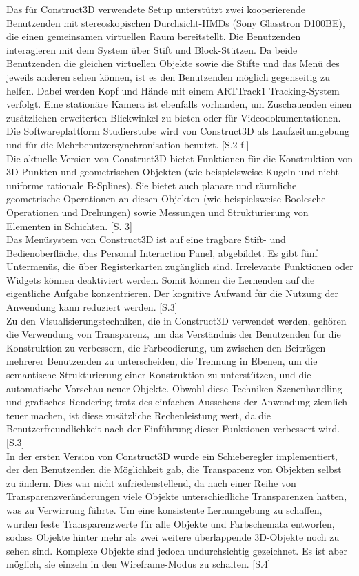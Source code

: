 \documentclass[deutsch]{llncs}
\begin{document}
Das für Construct3D verwendete Setup unterstützt zwei kooperierende Benutzenden mit stereoskopischen Durchsicht-HMDs (Sony Glasstron D100BE), die einen gemeinsamen virtuellen Raum bereitstellt. Die Benutzenden interagieren mit dem System über Stift und Block-Stützen. Da beide Benutzenden die gleichen virtuellen Objekte sowie die Stifte und das Menü des jeweils anderen sehen können, ist es den Benutzenden möglich gegenseitig zu helfen. Dabei werden Kopf und Hände mit einem ARTTrack1 Tracking-System verfolgt. Eine stationäre Kamera ist ebenfalls vorhanden, um Zuschauenden einen zusätzlichen erweiterten Blickwinkel zu bieten oder für Videodokumentationen. Die Softwareplattform Studierstube wird von Construct3D als Laufzeitumgebung und für die Mehrbenutzersynchronisation benutzt. [S.2 f.]\\
Die aktuelle Version von Construct3D bietet Funktionen für die Konstruktion von 3D-Punkten und geometrischen Objekten (wie beispielsweise Kugeln und nicht-uniforme rationale B-Splines). Sie bietet auch planare und räumliche geometrische Operationen an diesen Objekten (wie beispielsweise Boolesche Operationen und Drehungen) sowie Messungen und Strukturierung von Elementen in Schichten. [S. 3]\\
Das Menüsystem von Construct3D ist auf eine tragbare Stift- und Bedienoberfläche, das Personal Interaction Panel, abgebildet. Es gibt fünf Untermenüs, die über Registerkarten zugänglich sind. Irrelevante Funktionen oder Widgets können deaktiviert werden. Somit können die Lernenden auf die eigentliche Aufgabe konzentrieren. Der kognitive Aufwand für die Nutzung der Anwendung kann reduziert werden. [S.3]\\
Zu den Visualisierungstechniken, die in Construct3D verwendet werden, gehören die Verwendung von Transparenz, um das Verständnis der Benutzenden für die Konstruktion zu verbessern, die Farbcodierung, um zwischen den Beiträgen mehrerer Benutzenden zu unterscheiden, die Trennung in Ebenen, um die semantische Strukturierung einer Konstruktion zu unterstützen, und die automatische Vorschau neuer Objekte. Obwohl diese Techniken Szenenhandling und grafisches Rendering trotz des einfachen Aussehens der Anwendung ziemlich teuer machen, ist diese zusätzliche Rechenleistung wert, da die Benutzerfreundlichkeit nach der Einführung dieser Funktionen verbessert wird. [S.3]\\
In der ersten Version von Construct3D wurde ein Schieberegler implementiert, der den Benutzenden die Möglichkeit gab, die Transparenz von Objekten selbst zu ändern. Dies war nicht zufriedenstellend, da nach einer Reihe von Transparenzveränderungen viele Objekte unterschiedliche Transparenzen hatten, was zu Verwirrung führte. Um eine konsistente Lernumgebung zu schaffen, wurden feste Transparenzwerte für alle Objekte und Farbschemata entworfen, sodass Objekte hinter mehr als zwei weitere überlappende 3D-Objekte noch zu sehen sind. Komplexe Objekte sind jedoch undurchsichtig gezeichnet. Es ist aber möglich, sie einzeln in den Wireframe-Modus zu schalten. [S.4]\\
\end{document}
